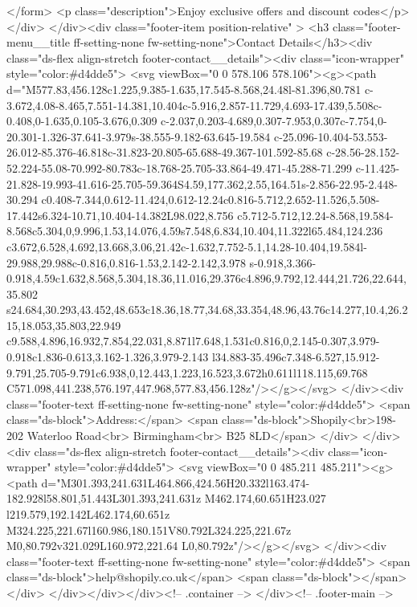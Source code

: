 {{{{{{{                </form>
<p class="description">Enjoy exclusive offers and discount codes</p>
            </div>
          </div><div class="footer-item position-relative" >
            <h3 class="footer-menu__title ff-setting-none fw-setting-none">Contact Details</h3><div class="ds-flex align-stretch footer-contact__details"><div class="icon-wrapper" style="color:#d4dde5">
                    <svg viewBox="0 0 578.106 578.106"><g><path d="M577.83,456.128c1.225,9.385-1.635,17.545-8.568,24.48l-81.396,80.781 c-3.672,4.08-8.465,7.551-14.381,10.404c-5.916,2.857-11.729,4.693-17.439,5.508c-0.408,0-1.635,0.105-3.676,0.309 c-2.037,0.203-4.689,0.307-7.953,0.307c-7.754,0-20.301-1.326-37.641-3.979s-38.555-9.182-63.645-19.584 c-25.096-10.404-53.553-26.012-85.376-46.818c-31.823-20.805-65.688-49.367-101.592-85.68 c-28.56-28.152-52.224-55.08-70.992-80.783c-18.768-25.705-33.864-49.471-45.288-71.299 c-11.425-21.828-19.993-41.616-25.705-59.364S4.59,177.362,2.55,164.51s-2.856-22.95-2.448-30.294 c0.408-7.344,0.612-11.424,0.612-12.24c0.816-5.712,2.652-11.526,5.508-17.442s6.324-10.71,10.404-14.382L98.022,8.756 c5.712-5.712,12.24-8.568,19.584-8.568c5.304,0,9.996,1.53,14.076,4.59s7.548,6.834,10.404,11.322l65.484,124.236 c3.672,6.528,4.692,13.668,3.06,21.42c-1.632,7.752-5.1,14.28-10.404,19.584l-29.988,29.988c-0.816,0.816-1.53,2.142-2.142,3.978 s-0.918,3.366-0.918,4.59c1.632,8.568,5.304,18.36,11.016,29.376c4.896,9.792,12.444,21.726,22.644,35.802 s24.684,30.293,43.452,48.653c18.36,18.77,34.68,33.354,48.96,43.76c14.277,10.4,26.215,18.053,35.803,22.949 c9.588,4.896,16.932,7.854,22.031,8.871l7.648,1.531c0.816,0,2.145-0.307,3.979-0.918c1.836-0.613,3.162-1.326,3.979-2.143 l34.883-35.496c7.348-6.527,15.912-9.791,25.705-9.791c6.938,0,12.443,1.223,16.523,3.672h0.611l118.115,69.768 C571.098,441.238,576.197,447.968,577.83,456.128z"/></g></svg>
                  </div><div class="footer-text ff-setting-none fw-setting-none" style="color:#d4dde5">
                  <span class="ds-block">Address:</span>
                  <span class="ds-block">Shopily<br>198-202 Waterloo Road<br> Birmingham<br> B25 8LD</span>
                </div>
              </div><div class="ds-flex align-stretch footer-contact__details"><div class="icon-wrapper" style="color:#d4dde5">
                    <svg viewBox="0 0 485.211 485.211"><g><path d="M301.393,241.631L464.866,424.56H20.332l163.474-182.928l58.801,51.443L301.393,241.631z M462.174,60.651H23.027 l219.579,192.142L462.174,60.651z M324.225,221.67l160.986,180.151V80.792L324.225,221.67z M0,80.792v321.029L160.972,221.64 L0,80.792z"/></g></svg>
                  </div><div class="footer-text ff-setting-none fw-setting-none" style="color:#d4dde5">
                  <span class="ds-block">help@shopily.co.uk</span>
                  <span class="ds-block"></span>
                </div>
              </div></div></div><!-- .container -->
  </div><!-- .footer-main -->
    
}}}}}}}
